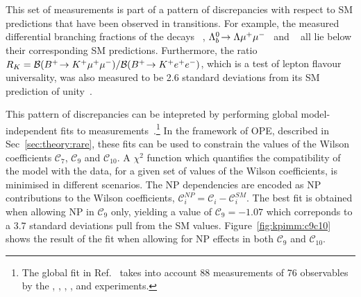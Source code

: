 This set of measurements is part of a pattern of discrepancies with respect to SM predictions that have been observed in \btosmm transitions. For example, the measured differential branching fractions of the decays \BsTophimm~\cite{LHCB-PAPER-2015-023}, ${{\Lambda}^0_{b}}\!\rightarrow \Lambda{\ensuremath{\mu^+\mu^-}}$~\cite{LHCB-PAPER-2015-009} and \BuToKmm~\cite{LHCB-PAPER-2014-006} all lie below their corresponding SM predictions. Furthermore, the ratio $R_{K} = {\mathcal{B}}({{{B}^+}}\!\rightarrow {\ensuremath{{K}^+}}{\ensuremath{\mu^+}}{\ensuremath{\mu^-}})/{\mathcal{B}}({{{B}^+}}\!\rightarrow {\ensuremath{{K}^+}}{\ensuremath{e^+}}{\ensuremath{e^-}})$, which is a test of lepton flavour universality, was also measured to be 2.6 standard deviations from its SM prediction of unity~\cite{LHCB-PAPER-2014-024}.

This pattern of discrepancies can be intepreted by performing global model-independent fits to \btosll measurements~\cite{straub}.\footnote{The global fit in Ref.~\cite{straub} takes into account 88 measurements of 76 observables by the \atlas, \babar, \belle, \cdf, \cms and \lhcb experiments.} In the framework of OPE, described in Sec~\ref{sec:theory:rare}, these fits can be used to constrain the values of the Wilson coefficients $\mathcal{C}_{7}$, $\mathcal{C}_{9}$ and $\mathcal{C}_{10}$. A $\chi^{2}$ function which quantifies the compatibility of the model with the data, for a given set of values of the Wilson coefficients, is minimised in different scenarios. The NP dependencies are encoded as NP contributions to the Wilson coefficients, $\mathcal{C}_{i}^{NP} = \mathcal{C}_{i}-\mathcal{C}_{i}^{SM}$. The best fit is obtained when allowing NP in $\mathcal{C}_{9}$ only, yielding a value of $\mathcal{C}_{9} = -1.07$ which correponds to a 3.7 standard deviations pull from the SM values. Figure~\ref{fig:kpimm:c9c10} shows the result of the fit when allowing for NP effects in both $\mathcal{C}_{9}$ and $\mathcal{C}_{10}$.

